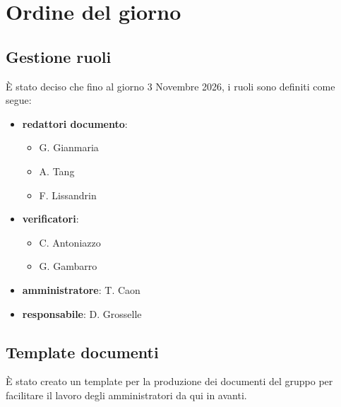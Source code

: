 \newpage
\vspace{0.8cm}

\section{Ordine del giorno}

\subsection{Gestione ruoli}
È stato deciso che fino al giorno 3 Novembre 2026, i ruoli sono definiti come segue:
\renewcommand{\labelitemii}{$\diamond$}
\begin{itemize}
    \item \textbf{redattori documento}:
    \begin{itemize}
        \item G. Gianmaria
        \item A. Tang
        \item F. Lissandrin
    \end{itemize}
    \item \textbf{verificatori}:
    \begin{itemize}
        \item C. Antoniazzo
        \item G. Gambarro
    \end{itemize}
    \item \textbf{amministratore}: T. Caon
    \item \textbf{responsabile}: D. Grosselle
\end{itemize}

\subsection{Template documenti}
È stato creato un template per la produzione dei documenti del gruppo per facilitare il lavoro degli amministratori da qui in avanti.

